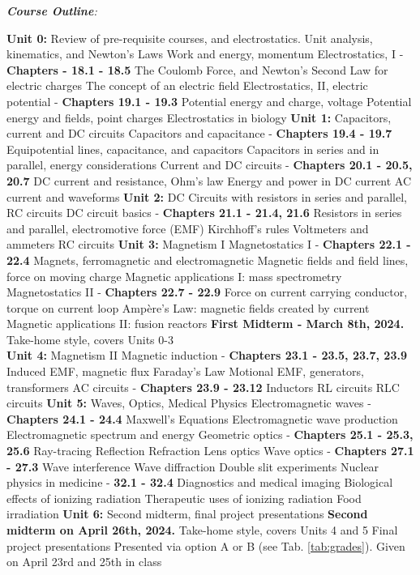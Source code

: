 \documentclass[10pt]{article}
\begin{document}
\clearpage
\twocolumn
\textit{\textbf{Course Outline}:}
\begin{outline}[enumerate]
\1 \textbf{Unit 0:} Review of pre-requisite courses, and electrostatics.
\2 Unit analysis, kinematics, and Newton's Laws
\2 Work and energy, momentum
\2 Electrostatics, I - \textbf{Chapters - 18.1 - 18.5}
\3 The Coulomb Force, and Newton's Second Law for electric charges
\3 The concept of an electric field
\2 Electrostatics, II, electric potential - \textbf{Chapters 19.1 - 19.3}
\3 Potential energy and charge, voltage
\3 Potential energy and fields, point charges
\3 Electrostatics in biology
\1 \textbf{Unit 1:} Capacitors, current and DC circuits
\2 Capacitors and capacitance - \textbf{Chapters 19.4 - 19.7}
\3 Equipotential lines, capacitance, and capacitors
\3 Capacitors in series and in parallel, energy considerations
\2 Current and DC circuits - \textbf{Chapters 20.1 - 20.5, 20.7}
\3 DC current and resistance, Ohm's law
\3 Energy and power in DC current
\3 AC current and waveforms
\1 \textbf{Unit 2:} DC Circuits with resistors in series and parallel, RC circuits
\2 DC circuit basics - \textbf{Chapters 21.1 - 21.4, 21.6}
\3 Resistors in series and parallel, electromotive force (EMF)
\3 Kirchhoff's rules
\3 Voltmeters and ammeters
\3 RC circuits
\1 \textbf{Unit 3:} Magnetism I
\2 Magnetostatics I - \textbf{Chapters 22.1 - 22.4}
\3 Magnets, ferromagnetic and electromagnetic
\3 Magnetic fields and field lines, force on moving charge
\3 Magnetic applications I: mass spectrometry
\2 Magnetostatics II - \textbf{Chapters 22.7 - 22.9}
\3 Force on current carrying conductor, torque on current loop
\3 Amp\`{e}re's Law: magnetic fields created by current
\3 Magnetic applications II: fusion reactors
\1 \textbf{First Midterm - March 8th, 2024.}
\2 Take-home style, covers Units 0-3 \\
\1 \textbf{Unit 4:} Magnetism II
\2 Magnetic induction - \textbf{Chapters 23.1 - 23.5, 23.7, 23.9}
\3 Induced EMF, magnetic flux
\3 Faraday's Law
\3 Motional EMF, generators, transformers
\2 AC circuits - \textbf{Chapters 23.9 - 23.12}
\3 Inductors
\3 RL circuits
\3 RLC circuits
\1 \textbf{Unit 5:} Waves, Optics, Medical Physics
\2 Electromagnetic waves - \textbf{Chapters 24.1 - 24.4}
\3 Maxwell's Equations
\3 Electromagnetic wave production
\3 Electromagnetic spectrum and energy
\2 Geometric optics - \textbf{Chapters 25.1 - 25.3, 25.6}
\3 Ray-tracing
\3 Reflection
\3 Refraction
\3 Lens optics
\2 Wave optics - \textbf{Chapters 27.1 - 27.3}
\3 Wave interference
\3 Wave diffraction
\3 Double slit experiments
\2 Nuclear physics in medicine - \textbf{32.1 - 32.4}
\3 Diagnostics and medical imaging
\3 Biological effects of ionizing radiation
\3 Therapeutic uses of ionizing radiation
\3 Food irradiation
\1 \textbf{Unit 6:} Second midterm, final project presentations
\2 \textbf{Second midterm on April 26th, 2024.}
\3 Take-home style, covers Units 4 and 5
\2 Final project presentations
\3 Presented via option A or B (see Tab. \ref{tab:grades}).
\3 Given on April 23rd and 25th in class
\end{outline}
\end{document}
